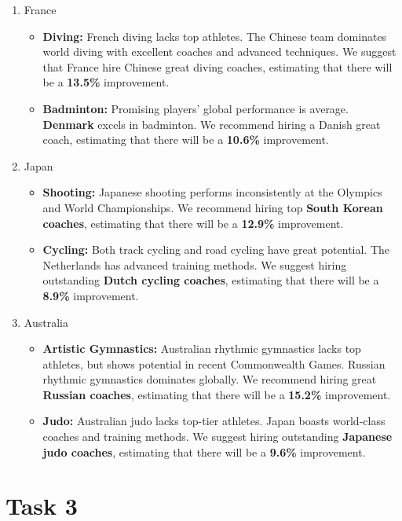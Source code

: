 \documentclass{mcmthesis}
\begin{document}
\begin{enumerate}
	\item France
	\begin{itemize}
		\item \textbf{Diving: } 
		French diving lacks top athletes. The Chinese team dominates world diving with excellent coaches and advanced techniques. We suggest that France hire Chinese great diving coaches, estimating that there will be a \textbf{13.5\%} improvement.
		\item \textbf{Badminton: }
		Promising players' global performance is average. \textbf{Denmark} excels in badminton. We recommend hiring a Danish great coach, estimating that there will be a \textbf{10.6\%} improvement.
	\end{itemize}
	
	\item Japan
	\begin{itemize}
		\item \textbf{Shooting: }
		Japanese shooting performs inconsistently at the Olympics and World Championships. We recommend hiring top \textbf{South Korean coaches}, estimating that there will be a \textbf{12.9\%} improvement.
		\item \textbf{Cycling: }
		Both track cycling and road cycling have great potential. The Netherlands has advanced training methods. We suggest hiring outstanding \textbf{Dutch cycling coaches}, estimating that there will be a \textbf{8.9\%} improvement.
	\end{itemize}
	
	\item Australia
	\begin{itemize}
		\item \textbf{Artistic Gymnastics: }
		Australian rhythmic gymnastics lacks top athletes, but shows potential in recent Commonwealth Games. Russian rhythmic gymnastics dominates globally. We recommend hiring great \textbf{Russian coaches}, estimating that there will be a \textbf{15.2\%} improvement.
		\item \textbf{Judo: }
		Australian judo lacks top-tier athletes. Japan boasts world-class coaches and training methods. We suggest hiring outstanding \textbf{Japanese judo coaches}, estimating that there will be a \textbf{9.6\%} improvement.
	\end{itemize}
	
\end{enumerate}
\section{Task 3}
\end{document}
